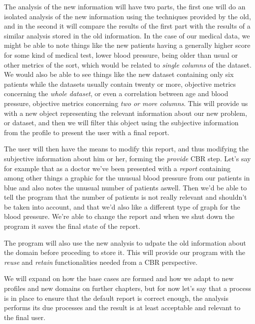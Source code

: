 The analysis of the new information will have two parts, the first one will do an isolated analysis of the new information using the techniques provided by the old, and in the second it will compare the results of the first part with the results of a similar analysis stored in the old information.
In the case of our medical data, we might be able to note things like the new patients having a generally higher score for some kind of medical test, lower blood pressure, being older than usual or other metrics of the sort, which would be related to \textit{single columns} of the dataset.
We would also be able to see things like the new dataset containing only six patients while the datasets usually contain twenty or more, objective metrics concerning the \textit{whole dataset}, or even a correlation between age and blood pressure, objective metrics concerning \textit{two or more columns}.
This will provide us with a new object representing the relevant information about our new problem, or dataset, and then we will filter this object using the subjective information from the profile to present the user with a final report.

The user will then have the means to modify this report, and thus modifying the subjective information about him or her, forming the \textit{provide} CBR step.
Let's say for example that as a doctor we've been presented with a \textit{report} containing among other things a graphic for the unusual blood pressure from our patients in blue and also notes the unusual number of patients aswell.
Then we'd be able to tell the program that the number of patients is not really relevant and shouldn't be taken into account, and that we'd also like a different type of graph for the blood pressure. We're able to change the report and when we shut down the program it saves the final state of the report.

The program will also use the new analysis to udpate the old information about the domain before proceding to store it.
This will provide our program with the \textit{reuse} and \textit{retain} functionalities needed from a CBR perspective.

We will expand on how the base cases are formed and how we adapt to new profiles and new domains on further chapters, but for now let's say that a process is in place to ensure that the default report is correct enough, the analysis performs its due processes and the result is at least acceptable and relevant to the final user.

